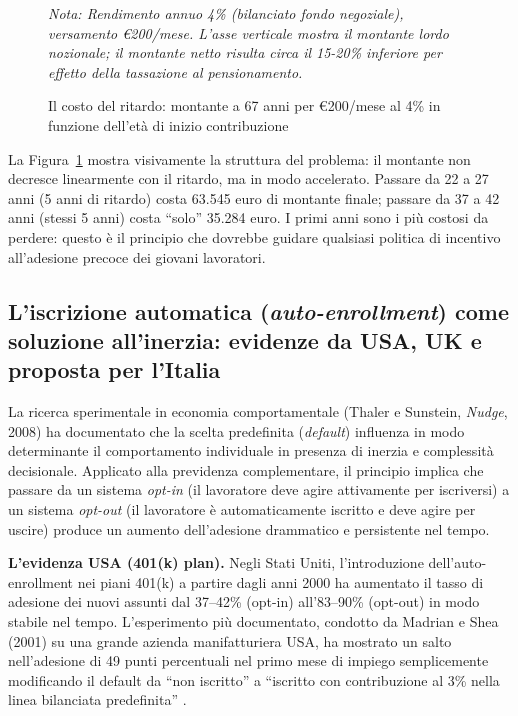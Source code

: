 \begin{figure}[h!]
\centering
\caption{Il costo del ritardo: montante a 67 anni per €200/mese al 4\%
         in funzione dell'età di inizio contribuzione}
\label{fig:vantaggio_tempo}
\small\emph{Nota: Rendimento annuo 4\% (bilanciato fondo negoziale), versamento €200/mese.
L'asse verticale mostra il montante lordo nozionale;
il montante netto risulta circa il 15-20\% inferiore per effetto
della tassazione al pensionamento.}
\end{figure}

\noindent
La Figura~\ref{fig:vantaggio_tempo} mostra visivamente la struttura
del problema: il montante non decresce linearmente con il ritardo,
ma in modo accelerato.
Passare da 22 a 27 anni (5 anni di ritardo) costa 63.545 euro
di montante finale; passare da 37 a 42 anni (stessi 5 anni)
costa ``solo'' 35.284 euro.
I primi anni sono i più costosi da perdere: questo è il principio
che dovrebbe guidare qualsiasi politica di incentivo all'adesione
precoce dei giovani lavoratori.

\subsection{L'iscrizione automatica (\emph{auto-enrollment})
            come soluzione all'inerzia:
            evidenze da USA, UK e proposta per l'Italia}
\label{sub:autoenrollment}

\noindent
La ricerca sperimentale in economia comportamentale (Thaler e Sunstein,
\emph{Nudge}, 2008) ha documentato che la scelta predefinita
(\emph{default}) influenza in modo determinante il comportamento
individuale in presenza di inerzia e complessità decisionale.
Applicato alla previdenza complementare, il principio implica che
passare da un sistema \emph{opt-in} (il lavoratore deve agire attivamente
per iscriversi) a un sistema \emph{opt-out} (il lavoratore è
automaticamente iscritto e deve agire per uscire) produce
un aumento dell'adesione drammatico e persistente nel tempo.

\medskip
\noindent
\textbf{L'evidenza USA (401(k) plan).}
Negli Stati Uniti, l'introduzione dell'auto-enrollment nei piani 401(k)
a partire dagli anni 2000 ha aumentato il tasso di adesione
dei nuovi assunti dal 37--42\% (opt-in) all'83--90\% (opt-out)
in modo stabile nel tempo.
L'esperimento più documentato, condotto da Madrian e Shea (2001)
su una grande azienda manifatturiera USA, ha mostrato un salto
nell'adesione di 49 punti percentuali nel primo mese di impiego
semplicemente modificando il default da ``non iscritto'' a ``iscritto
con contribuzione al 3\% nella linea bilanciata predefinita'' \cite{Lavoce2024a}.

